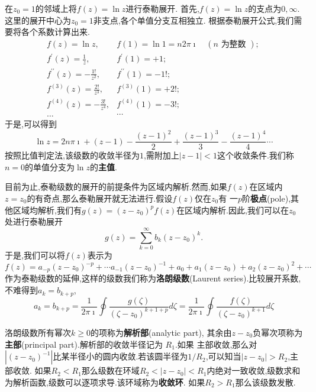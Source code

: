 \begin{examplebox}{在$z_0=1$的邻域上将$f(z) = \ln{z}$进行泰勒展开.}
    首先,$f(z) = \ln z $的支点为$0,\infty$.这里的展开中心为$z_0=1$非支点,各个单值分支互相独立.
    根据泰勒展开公式,我们需要将各个系数计算出来.
    \[
        \begin{array}{ll}
            f(z)=\ln z, & f(1)=\ln 1=n 2 \pi \imath \quad(n \text { 为整数 }) \text {; } \\
            f^{\prime}(z)=\frac{1}{z}, & f^{\prime}(1)=+1 ; \\
            f^{\prime \prime}(z)=-\frac{1 !}{z^2}, & f^{\prime \prime}(1)=-1 ! ; \\
            f^{(3)}(z)=\frac{2 !}{z^3}, & f^{(3)}(1)=+2 ! ; \\
            f^{(4)}(z)=-\frac{3 !}{z^4}, & f^{(4)}(1)=-3 ! ; \\
            \ldots & \cdots
            \end{array}
    \]
    于是,可以得到
    \[
    \ln z = 2 n \pi \imath + (z-1) - \frac{(z-1)^2}{2} +  \frac{(z-1)^3}{3} -  \frac{(z-1)^4}{4} \cdots
    \]
    按照比值判定法,该级数的收敛半径为$1$,需附加上$|z-1|< 1$这个收敛条件.我们称$n=0$的单值分支为$\ln z $的\textbf{主值}.
\end{examplebox}

目前为止,泰勒级数的展开的前提条件为区域内解析.然而,如果$f(z)$在区域内$z=z_0$的有奇点,那么泰勒展开就无法进行.假设$f(z)$仅在$z_0$有
一$p$阶\textbf{极点}(pole),其他区域均解析,我们有$g(z) = (z-z_0)^p f(z)$在区域内解析.因此,我们可以在$z_0$处进行泰勒展开
\begin{equation}
    g(z) = \sum_{k=0}^{\infty} b_k (z-z_0)^{k} .
\end{equation}
于是,我们可以将$f(z)$表示为
\begin{equation}
    f(z) = a_{-p} (z-z_0)^{-p} + \cdots a_{-1}(z-z_0)^{-1} + a_0 + a_{1} (z-z_0) + a_{2} (z-z_0)^2 + \cdots 
\end{equation}
作为泰勒级数的延伸,这样的级数我们称为\textbf{洛朗级数}(Laurent series).比较展开系数,不难得到$a_k = b_{k+p}$,
\begin{equation}
    a_k = b_{k+p} = \frac{1}{2\pi \imath} \oint \frac{g(\zeta)}{(\zeta - z_0)^{k+1+p}} d\zeta 
    = \frac{1}{2\pi \imath} \oint \frac{f(\zeta)}{(\zeta - z_0)^{k+1}} d\zeta
\end{equation}

洛朗级数所有幂次$k\geq 0$的项称为\textbf{解析部}(analytic part), 其余由$z-z_0$负幂次项称为\textbf{主部}(principal part).解析部的收敛半径记为
$R_1$.如果
主部收敛,那么对$|(z-z_0)^{-1}|$比某半径小的圆内收敛.若该圆半径为$1/R_2$,可以知当$|z-z_0|> R_2$,主部收敛.
如果$R_2 < R_1$那么级数在环域$R_2 < |z- z_0| < R_1$内绝对一致收敛,级数求和为解析函数,级数可以逐项求导.该环域称为\textbf{收敛环}.
如果$R_2 > R_1$那么该级数发散.

